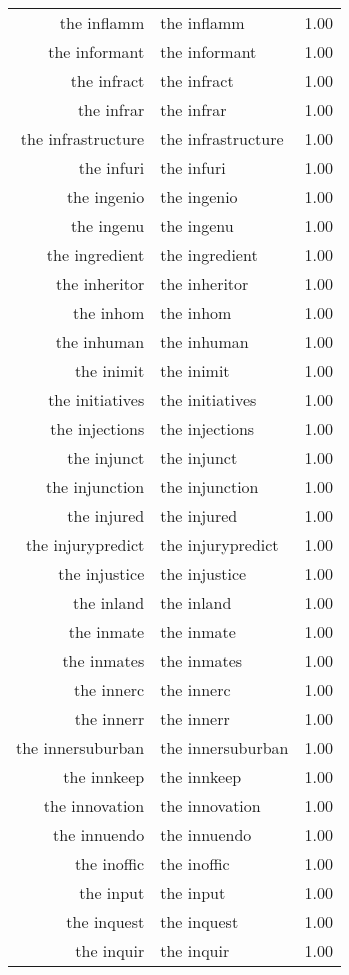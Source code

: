 \begin{table}[ht]
\begin{tabular}{rlr}
  the inflamm & the inflamm & 1.00 \\ 
  the informant & the informant & 1.00 \\ 
  the infract & the infract & 1.00 \\ 
  the infrar & the infrar & 1.00 \\ 
  the infrastructure & the infrastructure & 1.00 \\ 
  the infuri & the infuri & 1.00 \\ 
  the ingenio & the ingenio & 1.00 \\ 
  the ingenu & the ingenu & 1.00 \\ 
  the ingredient & the ingredient & 1.00 \\ 
  the inheritor & the inheritor & 1.00 \\ 
  the inhom & the inhom & 1.00 \\ 
  the inhuman & the inhuman & 1.00 \\ 
  the inimit & the inimit & 1.00 \\ 
  the initiatives & the initiatives & 1.00 \\ 
  the injections & the injections & 1.00 \\ 
  the injunct & the injunct & 1.00 \\ 
  the injunction & the injunction & 1.00 \\ 
  the injured & the injured & 1.00 \\ 
  the injurypredict & the injurypredict & 1.00 \\ 
  the injustice & the injustice & 1.00 \\ 
  the inland & the inland & 1.00 \\ 
  the inmate & the inmate & 1.00 \\ 
  the inmates & the inmates & 1.00 \\ 
  the innerc & the innerc & 1.00 \\ 
  the innerr & the innerr & 1.00 \\ 
  the innersuburban & the innersuburban & 1.00 \\ 
  the innkeep & the innkeep & 1.00 \\ 
  the innovation & the innovation & 1.00 \\ 
  the innuendo & the innuendo & 1.00 \\ 
  the inoffic & the inoffic & 1.00 \\ 
  the input & the input & 1.00 \\ 
  the inquest & the inquest & 1.00 \\ 
  the inquir & the inquir & 1.00 \\ 

\end{tabular}
\end{table}
